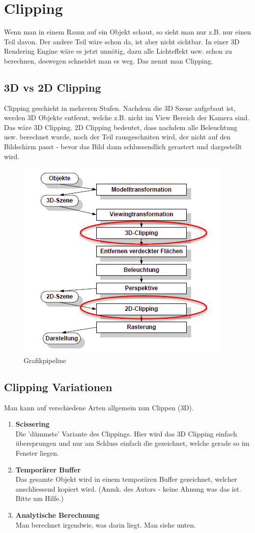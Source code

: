 \chapter{Clipping}

Wenn man in einem Raum auf ein Objekt schaut, so sieht man nur z.B. nur einen Teil davon. Der andere Teil wäre schon da, ist aber nicht sichtbar. In einer 3D Rendering Engine wäre es jetzt unnötig, dazu alle Lichteffekt usw. schon zu berechnen, deswegen schneidet man es weg. Das nennt man Clipping.

\section{3D vs 2D Clipping}
Clipping geschieht in mehreren Stufen. Nachdem die 3D Szene aufgebaut ist, werden 3D Objekte entfernt, welche z.B. nicht im View Bereich der Kamera sind. Das wäre 3D Clipping. 2D Clipping bedeutet, dass nachdem alle Beleuchtung usw. berechnet wurde, noch der Teil rausgeschniten wird, der nicht auf den Bildschirm passt - bevor das Bild dann schlussendlich gerastert und dargestellt wird.
\begin{figure}[!ht]
	\centering
	\includegraphics[width=0.4\linewidth]{fig/grafikpipeline}
	\caption{Grafikpipeline}
	\label{fig:grafikpipeline}
\end{figure}

\section{Clipping Variationen}
Man kann auf verschiedene Arten allgemein nun Clippen (3D).
\begin{enumerate}
	\item \textbf{Scissering} \\
	Die 'dümmste' Variante des Clippings. Hier wird das 3D Clipping einfach übersprungen und nur am Schluss einfach die gezeichnet, welche gerade so im Fenster liegen.
	\item \textbf{Temporärer Buffer} \\
	Das gesamte Objekt wird in einem temporären Buffer gezeichnet, welcher anschliessend kopiert wird. (Anmk. des Autors - keine Ahnung was das ist. Bitte um Hilfe.)
	\item \textbf{Analytische Berechnung} \\ 
	Man berechnet irgendwie, was darin liegt. Man siehe unten.
\end{enumerate}

